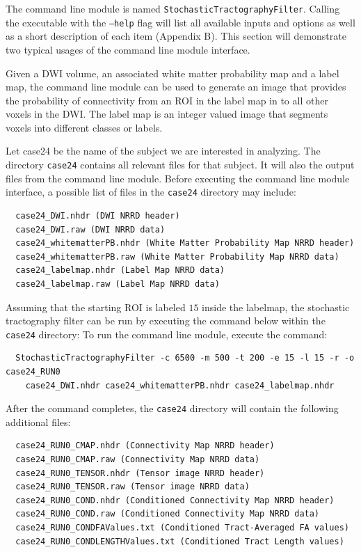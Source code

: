 The command line module is named \texttt{StochasticTractographyFilter}.  Calling the executable with the \texttt{--help} flag will list all available inputs and options as well as a short description of each item (Appendix B).  This section will demonstrate two typical usages of the command line module interface.

Given a DWI volume, an associated white matter probability map and a label map, the command line module can be used to generate an image that provides the probability of connectivity from an ROI in the label map in to all other voxels in the DWI.  The label map is an integer valued image that segments voxels into different classes or labels.

Let case24 be the name of the subject we are interested in analyzing.  The directory \texttt{case24} contains all relevant files for that subject.  It will also the output files from the command line module.  Before executing the command line module interface, a possible list of files in the \texttt{case24} directory may include:
\begin{verbatim}
  case24_DWI.nhdr (DWI NRRD header)
  case24_DWI.raw (DWI NRRD data)
  case24_whitematterPB.nhdr (White Matter Probability Map NRRD header)
  case24_whitematterPB.raw (White Matter Probability Map NRRD data)
  case24_labelmap.nhdr (Label Map NRRD data)
  case24_labelmap.raw (Label Map NRRD data)
\end{verbatim}
Assuming that the starting ROI is labeled $15$ inside the labelmap, the stochastic tractography filter can be run by executing the command below within the \texttt{case24} directory: 
To run the command line module, execute the command:
\begin{verbatim}
  StochasticTractographyFilter -c 6500 -m 500 -t 200 -e 15 -l 15 -r -o case24_RUN0
    case24_DWI.nhdr case24_whitematterPB.nhdr case24_labelmap.nhdr
\end{verbatim}
After the command completes, the \texttt{case24} directory will contain the following additional files:
\begin{verbatim}
  case24_RUN0_CMAP.nhdr (Connectivity Map NRRD header)
  case24_RUN0_CMAP.raw (Connectivity Map NRRD data)
  case24_RUN0_TENSOR.nhdr (Tensor image NRRD header)
  case24_RUN0_TENSOR.raw (Tensor image NRRD data)
  case24_RUN0_COND.nhdr (Conditioned Connectivity Map NRRD header)
  case24_RUN0_COND.raw (Conditioned Connectivity Map NRRD data)
  case24_RUN0_CONDFAValues.txt (Conditioned Tract-Averaged FA values)
  case24_RUN0_CONDLENGTHValues.txt (Conditioned Tract Length values)
\end{verbatim}

